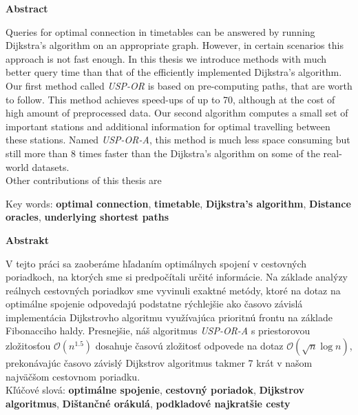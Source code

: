 \documentclass[a4paper]{article}
\renewenvironment{abstract}[1]
{
	\Large
	\begin{center}
		\textbf{#1}
	\end{center}
	
	\normalsize
	
	\addtolength{\leftskip}{1in}
	\addtolength{\rightskip}{1in}
	\setlength{\parindent}{0in}
}
{
}
\numberwithin{algorithm}{section}
\numberwithin{figure}{section}
\numberwithin{table}{section}
\numberwithin{equation}{section}
\begin{document}
    \begin{abstract}{Abstract}
		Queries for optimal connection in timetables can be answered by running Dijkstra's algorithm on an appropriate graph. However, in certain scenarios this approach is not fast enough. In this thesis we introduce methods with much better query time than that of the efficiently implemented Dijkstra's algorithm. \\

		Our first method called {\it USP-OR} is based on pre-computing paths, that are worth to follow. This method achieves speed-ups of up to 70, although at the cost of high amount of preprocessed data. Our second algorithm computes a small set of important stations and additional information for optimal travelling between these stations. Named {\it USP-OR-A}, this method is much less space consuming but still more than 8 times faster than the Dijkstra's algorithm on some of the real-world datasets. \\
    
        Other contributions of this thesis are 

		Key words: \textbf{optimal connection}, \textbf{timetable}, \textbf{Dijkstra's algorithm}, \textbf{Distance oracles}, \textbf{underlying shortest paths}
	\end{abstract}	

    \begin{abstract}{Abstrakt}
        V tejto práci sa zaoberáme hľadaním optimálnych spojení v cestovných poriadkoch, na ktorých sme si predpočítali určité informácie. Na základe analýzy reálnych cestovných poriadkov sme vyvinuli exaktné metódy, ktoré na dotaz na optimálne spojenie odpovedajú podstatne rýchlejšie ako časovo závislá implementácia Dijkstrovho algoritmu využívajúca prioritnú frontu na základe Fibonacciho haldy. Presnejšie, náš algoritmus \textit{USP-OR-A} s priestorovou zložitosťou $\mathcal{O}(n^{1.5})$ dosahuje časovú zložitosť odpovede na dotaz $\mathcal{O}(\sqrt{n} \log n)$, prekonávajúc časovo závislý Dijkstrov algoritmus takmer 7 krát v našom najväčšom cestovnom poriadku. \\

		Kľúčové slová: \textbf{optimálne spojenie}, \textbf{cestovný poriadok}, \textbf{Dijkstrov algoritmus}, \textbf{Dištančné orákulá}, \textbf{podkladové najkratšie cesty}
	\end{abstract}	
	
\end{document}
